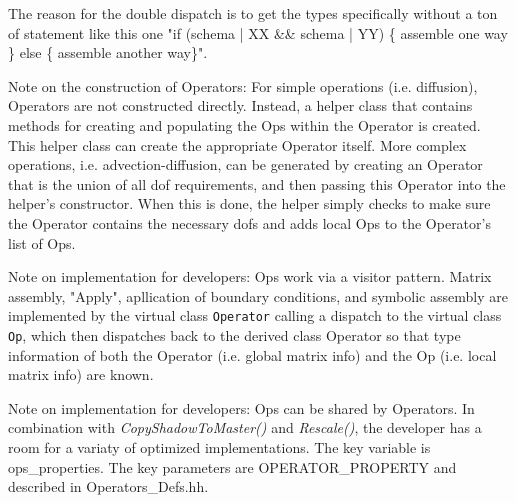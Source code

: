 The reason for the double dispatch is to get the types specifically
without a ton of statement like this one "if (schema | XX \&\& schema | YY) 
\{ assemble one way \} else \{ assemble another way\}".

Note on the construction of Operators: For simple operations
(i.e. diffusion), Operators are not constructed directly.  Instead, 
a helper class that contains methods for creating and populating the
Ops within the Operator is created. This helper class can create the
appropriate Operator itself. More complex operations, i.e. 
advection-diffusion, can be generated by creating an Operator that 
is the union of all dof requirements, and then passing this Operator
into the helper's constructor. When this is done, the helper simply 
checks to make sure the Operator contains the necessary dofs and
adds local Ops to the Operator's list of Ops.

Note on implementation for developers: Ops work via a visitor pattern.
Matrix assembly, "Apply", apllication of boundary conditions, and symbolic assembly 
are implemented by the virtual class {\tt Operator} calling a dispatch to the 
virtual class {\tt Op}, which then dispatches back to the derived class Operator so that
type information of both the Operator (i.e. global matrix info) and 
the Op (i.e. local matrix info) are known.

Note on implementation for developers: Ops can be shared by
Operators. In combination with {\it CopyShadowToMaster()} and {\it Rescale()},
the developer has a room for a variaty of optimized implementations.
The key variable is ops\_properties. The key parameters are 
OPERATOR\_PROPERTY and described in Operators\_Defs.hh.





